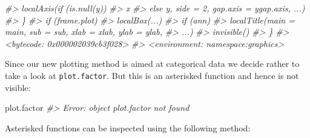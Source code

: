 \documentclass[
]{book}
\newenvironment{Shaded}{\begin{snugshade}}{\end{snugshade}}
\newcommand{\CommentTok}[1]{\textcolor[rgb]{0.56,0.35,0.01}{\textit{#1}}}
\newcommand{\NormalTok}[1]{#1}
\begin{document}
\begin{Shaded}
\begin{Highlighting}[]
\CommentTok{\#\textgreater{}         localAxis(if (is.null(y)) }
\CommentTok{\#\textgreater{}             x}
\CommentTok{\#\textgreater{}         else y, side = 2, gap.axis = ygap.axis, ...)}
\CommentTok{\#\textgreater{}     \}}
\CommentTok{\#\textgreater{}     if (frame.plot) }
\CommentTok{\#\textgreater{}         localBox(...)}
\CommentTok{\#\textgreater{}     if (ann) }
\CommentTok{\#\textgreater{}         localTitle(main = main, sub = sub, xlab = xlab, ylab = ylab, }
\CommentTok{\#\textgreater{}             ...)}
\CommentTok{\#\textgreater{}     invisible()}
\CommentTok{\#\textgreater{} \}}
\CommentTok{\#\textgreater{} \textless{}bytecode: 0x000002039cb3f028\textgreater{}}
\CommentTok{\#\textgreater{} \textless{}environment: namespace:graphics\textgreater{}}
\end{Highlighting}
\end{Shaded}

Since our new plotting method is aimed at categorical data we decide rather to take a look at \texttt{plot.factor}. But this is an asterisked function and hence is not visible:

\begin{Shaded}
\begin{Highlighting}[]
\NormalTok{plot.factor}
\CommentTok{\#\textgreater{} Error: object \textquotesingle{}plot.factor\textquotesingle{} not found}
\end{Highlighting}
\end{Shaded}

Asterisked functions can be inspected using the following method:
\end{document}
